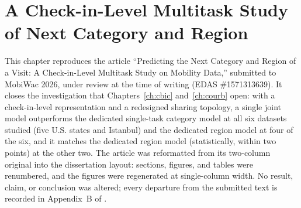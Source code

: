 \chapter[A Check-in-Level Multitask Study of Next Category and Region]{A Check-in-Level Multitask Study of Next Category and Region}
\label{ch:mobiwac}

\begin{chapterpreface}
This chapter reproduces the article ``Predicting the Next Category and Region of a
Visit: A Check-in-Level Multitask Study on Mobility Data,'' submitted to MobiWac
2026, under review at the time of writing (EDAS \#1571313639). It closes the
investigation that Chapters~\ref{ch:cbic} and~\ref{ch:courb} open: with a
check-in-level representation and a redesigned sharing topology, a single joint
model outperforms the dedicated single-task category model at all six datasets
studied (five U.S. states and Istanbul) and the dedicated region model at four of
the six, and it matches the dedicated region model (statistically, within two
points) at the other two. The article was
reformatted from its two-column original into the dissertation layout: sections,
figures, and tables were renumbered, and the figures were regenerated at
single-column width. No result, claim, or conclusion was altered; every departure
from the submitted text is recorded in Appendix~B of \extravolume.
\end{chapterpreface}

